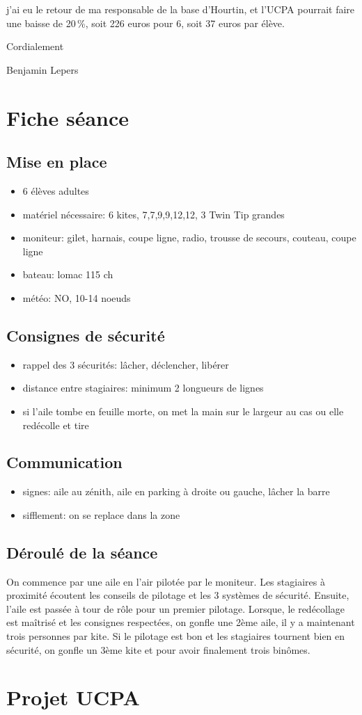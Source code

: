 \documentclass[11pt,a4paper]{report}
\begin{document}
j'ai eu le retour de ma responsable de la base d'Hourtin, et l'UCPA
pourrait faire une baisse de 20\,\%, soit 226 euros pour 6, soit 37 euros
par élève.

Cordialement

Benjamin Lepers
\chapter{Fiche séance\label{fiche_seance}}
\section{Mise en place}
\begin{itemize}
\item 6 élèves adultes
\item matériel nécessaire: 6 kites, 7,7,9,9,12,12, 3 Twin Tip grandes
\item moniteur: gilet, harnais, coupe ligne, radio, trousse de secours, couteau, coupe ligne
\item bateau: lomac 115 ch
\item météo: NO, 10-14 noeuds
\end{itemize}
\section{Consignes de sécurité}
\begin{itemize}
\item rappel des 3 sécurités: lâcher, déclencher, libérer
\item distance entre stagiaires: minimum 2 longueurs de lignes
\item si l'aile tombe en feuille morte, on met la main sur le largeur au cas ou elle redécolle et tire
\end{itemize}
\section{Communication}
\begin{itemize}
\item signes: aile au zénith, aile en parking à droite ou gauche, lâcher la barre
\item sifflement: on se replace dans la zone
\end{itemize}
\section{Déroulé de la séance}
On commence par une aile en l'air pilotée par le moniteur.
Les stagiaires à proximité écoutent les conseils de pilotage et les 3 systèmes
de sécurité.
Ensuite, l'aile est passée à tour de rôle pour un premier pilotage.
Lorsque, le redécollage est maîtrisé et les consignes respectées, 
on gonfle une 2ème aile, il y a maintenant trois personnes par kite.
Si le pilotage est bon et les stagiaires tournent bien en sécurité,
on gonfle un 3ème kite et pour avoir finalement trois binômes.


\chapter{Projet UCPA\label{ucpa_projet}}




\end{document}
